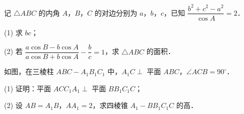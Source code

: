 \begin{question}
记 $\triangle ABC$ 的内角 $A$，$B$，$C$ 的对边分别为 $a$，$b$，$c$，已知 $\dfrac{b^2+c^2-a^2}{\cos A}=2$．

  (1) 求 $bc$；

  (2) 若 $\dfrac{a\cos B-b\cos A}{a\cos B+b\cos A}-\dfrac bc=1$，求 $\triangle ABC$ 的面积．

\Needspace{0.4\textheight}
\end{question}
\begin{question}
如图，在三棱柱 $ABC-A_1B_1C_1$ 中，$A_1C\perp$ 平面 $ABC$，$\angle ACB=90^\circ$．
\nopagebreak[4]
\begin{center}\end{center}
\nopagebreak[4]
  (1) 证明：平面 $ACC_1A_1\perp$ 平面 $BB_1C_1C$；

  (2) 设 $AB=A_1B$，$AA_1=2$，求四棱锥 $A_1-BB_1C_1C$ 的高．

\end{question}
